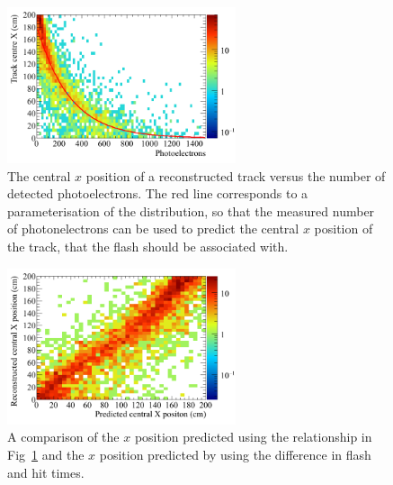 \begin{figure}[h!]
  \centering
  \includegraphics[width=0.6\textwidth]{NumPE_Distance}
  \caption[The central $x$ position of a reconstructed track versus the number of detected photoelectrons]
          {The central $x$ position of a reconstructed track versus the number of detected photoelectrons. The red line corresponds to a parameterisation of the distribution, so that the measured number of photonelectrons can be used to predict the central $x$ position of the track, that the flash should be associated with.}
  \label{fig:PD_PExPlot}
\end{figure}

\begin{figure}[h!]
  \centering
  \includegraphics[width=0.6\textwidth]{DiffFlashPredReco}
  \caption[The predicted $x$ positions of flashes using the relationship between photoelectron and drift distance]
          {A comparison of the $x$ position predicted using the relationship in Fig~\ref{fig:PD_PExPlot} and the $x$ position predicted by using the difference in flash and hit times.}
  \label{fig:PD_PEDiffX}
\end{figure}

